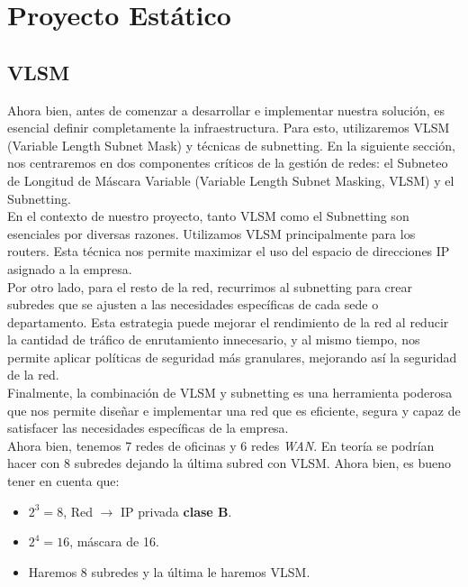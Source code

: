 \section{Proyecto Estático}

\subsection{VLSM}

Ahora bien, antes de comenzar a desarrollar e implementar nuestra solución, es
esencial definir completamente la infraestructura. Para esto, utilizaremos
VLSM (Variable Length Subnet Mask) y técnicas de subnetting. En la siguiente
sección, nos centraremos en dos componentes críticos de la gestión de redes:
el Subneteo de Longitud de Máscara Variable
(Variable Length Subnet Masking, VLSM) y el Subnetting.
\\


En el contexto de nuestro proyecto, tanto VLSM como el Subnetting son esenciales
por diversas razones. Utilizamos VLSM principalmente para los routers. Esta
técnica nos permite maximizar el uso del espacio de direcciones IP asignado a
la empresa.
\\


Por otro lado, para el resto de la red, recurrimos al subnetting para crear
subredes que se ajusten a las necesidades específicas de cada sede o
departamento. Esta estrategia puede mejorar el rendimiento de la red al reducir
la cantidad de tráfico de enrutamiento innecesario, y al mismo tiempo, nos
permite aplicar políticas de seguridad más granulares, mejorando así la
seguridad de la red.
\\

Finalmente, la combinación de VLSM y subnetting es una herramienta poderosa que
nos permite diseñar e implementar una red que es eficiente, segura y capaz de
satisfacer las necesidades específicas de la empresa.
\\

Ahora bien, tenemos 7 redes de oficinas y 6 redes \textit{WAN}. En teoría se
podrían hacer con 8 subredes dejando la última subred con VLSM. Ahora bien, es
bueno tener en cuenta que:

\begin{itemize}
    \item \(2^3 = 8\), Red \(\rightarrow\) IP privada \textbf{clase B}.
    \item \(2^4 = 16\), máscara de 16.
    \item Haremos 8 subredes y la última le haremos VLSM.
\end{itemize}

